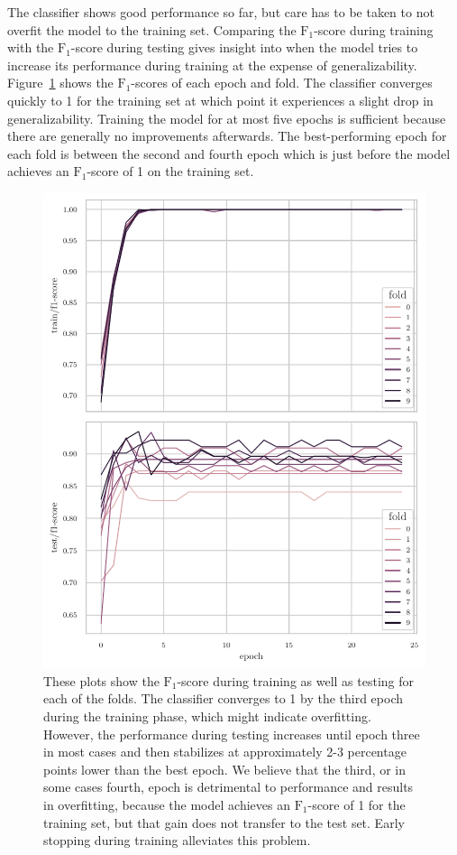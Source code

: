 \documentclass[final]{vutinfth} %
\begin{document}
The classifier shows good performance so far, but care has to be taken
to not overfit the model to the training set. Comparing the
$\mathrm{F}_1$-score during training with the $\mathrm{F}_1$-score
during testing gives insight into when the model tries to increase its
performance during training at the expense of
generalizability. Figure~\ref{fig:classifier-hyp-folds} shows the
$\mathrm{F}_1$-scores of each epoch and fold. The classifier converges
quickly to \num{1} for the training set at which point it experiences
a slight drop in generalizability. Training the model for at most five
epochs is sufficient because there are generally no improvements
afterwards. The best-performing epoch for each fold is between the
second and fourth epoch which is just before the model achieves an
$\mathrm{F}_1$-score of \num{1} on the training set.

\begin{figure}
  \centering
  \includegraphics[width=.9\textwidth]{graphics/classifier-hyp-folds-f1.pdf}
  \caption[$\mathrm{F}_1$-score of stratified $10$-fold cross
  validation.]{These plots show the $\mathrm{F}_1$-score during
    training as well as testing for each of the folds. The classifier
    converges to \num{1} by the third epoch during the training phase,
    which might indicate overfitting. However, the performance during
    testing increases until epoch three in most cases and then
    stabilizes at approximately 2-3 percentage points lower than the
    best epoch. We believe that the third, or in some cases fourth,
    epoch is detrimental to performance and results in overfitting,
    because the model achieves an $\mathrm{F}_1$-score of \num{1} for
    the training set, but that gain does not transfer to the test
    set. Early stopping during training alleviates this problem.}
  \label{fig:classifier-hyp-folds}
\end{figure}
\end{document}
